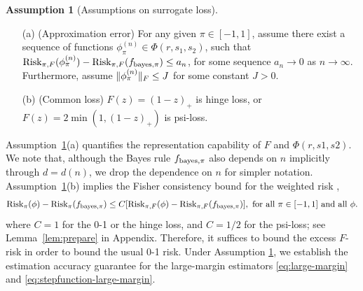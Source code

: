 \documentclass[11pt]{article}
\theoremstyle{plain}
\theoremstyle{definition}
\newtheorem{assumption}{Assumption}
\def\bayespif{f_{\textup{bayes},\pi}}
\def\risk{\textup{Risk}_\pi}
\def\riskF{\textup{Risk}_{\pi,F}}
\begin{document}
\begin{assumption}[Assumptions on surrogate loss]\label{ass:main} \hfill
\begin{enumerate}
\item[(a)] (Approximation error) For any given $\pi\in[-1,1]$, assume there exist a sequence of functions $\phi^{(n)}_\pi\in\Phi(r,s_1,s_2)$, such that $\riskF(\phi^{(n)}_\pi)-\riskF(\bayespif)\leq a_n$, for some sequence $a_n\to 0$ as $n\to\infty$. Furthermore, assume $\lVert\phi_{\pi}^{(n)}\rVert_F \leq J$ for some constant $J>0$. 
\item[(b)] (Common loss) $F(z)=(1-z)_{+}$ is hinge loss, or $F(z)=2\min(1,(1-z)_{+})$ is psi-loss. 
\end{enumerate}
\end{assumption}

\noindent
Assumption~\ref{ass:main}(a) quantifies the representation capability of $F$ and $\Phi(r, s1, s2)$. We note that, although the Bayes rule $\bayespif$ also depends on $n$ implicitly through $d=d(n)$, we drop the dependence on $n$ for simpler notation. Assumption~\ref{ass:main}(b) implies the Fisher consistency bound for the weighted risk \citep{scott2011surrogate},
\begin{equation*} \label{eq:fisher}
\risk(\phi)-\risk(\bayespif)\leq C[\riskF(\phi)-\riskF(\bayespif)], \text{ for all $\pi\in[-1,1]$ and all $\phi$}.
\end{equation*}
where $C=1$ for the 0-1 or the hinge loss, and $C=1/2$ for the psi-loss; see Lemma~\ref{lem:prepare} in Appendix. Therefore, it suffices to bound the excess $F$-risk in order to bound the usual 0-1 risk. Under Assumption \ref{ass:main}, we establish the estimation accuracy guarantee for the large-margin estimators \eqref{eq:large-margin} and \eqref{eq:stepfunction-large-margin}. 
\end{document}
